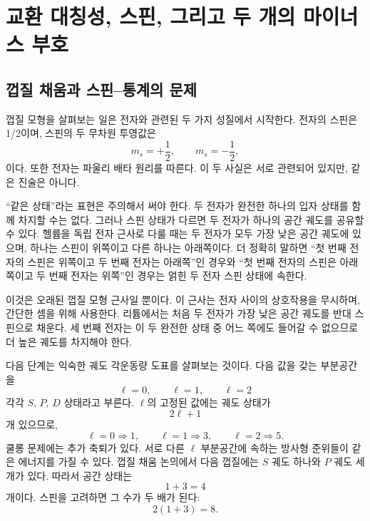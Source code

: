 \chapter{교환 대칭성, 스핀, 그리고 두 개의 마이너스 부호}

\section{껍질 채움과 스핀--통계의 문제}

껍질 모형을 살펴보는 일은 전자와 관련된 두 가지 성질에서 시작한다. 전자의 스핀은 1/2이며, 스핀의 두 무차원 투영값은
\begin{equation}
m_s=+\frac12,
\qquad
m_s=-\frac12,
\end{equation}
이다. 또한 전자는 파울리 배타 원리를 따른다. 이 두 사실은 서로 관련되어 있지만, 같은 진술은 아니다.

``같은 상태''라는 표현은 주의해서 써야 한다. 두 전자가 완전한 하나의 입자 상태를 함께 차지할 수는 없다. 그러나 스핀 상태가 다르면 두 전자가 하나의 공간 궤도를 공유할 수 있다. 헬륨을 독립 전자 근사로 다룰 때는 두 전자가 모두 가장 낮은 공간 궤도에 있으며, 하나는 스핀이 위쪽이고 다른 하나는 아래쪽이다. 더 정확히 말하면 ``첫 번째 전자의 스핀은 위쪽이고 두 번째 전자는 아래쪽''인 경우와 ``첫 번째 전자의 스핀은 아래쪽이고 두 번째 전자는 위쪽''인 경우는 얽힌 두 전자 스핀 상태에 속한다.

이것은 오래된 껍질 모형 근사일 뿐이다. 이 근사는 전자 사이의 상호작용을 무시하며, 간단한 셈을 위해 사용한다. 리튬에서는 처음 두 전자가 가장 낮은 공간 궤도를 반대 스핀으로 채운다. 세 번째 전자는 이 두 완전한 상태 중 어느 쪽에도 들어갈 수 없으므로 더 높은 궤도를 차지해야 한다.

다음 단계는 익숙한 궤도 각운동량 도표를 살펴보는 것이다. 다음 값을 갖는 부분공간을
\begin{equation}
\ell=0,\qquad \ell=1,\qquad \ell=2
\end{equation}
각각 \(S\), \(P\), \(D\) 상태라고 부른다. \(\ell\)의 고정된 값에는 궤도 상태가
\begin{equation}
2\ell+1
\end{equation}
개 있으므로,
\begin{equation}
\ell=0\Rightarrow 1,
\qquad
\ell=1\Rightarrow 3,
\qquad
\ell=2\Rightarrow 5.
\end{equation}
쿨롱 문제에는 추가 축퇴가 있다. 서로 다른 \(\ell\) 부분공간에 속하는 방사형 준위들이 같은 에너지를 가질 수 있다. 껍질 채움 논의에서 다음 껍질에는 \(S\) 궤도 하나와 \(P\) 궤도 세 개가 있다. 따라서 공간 상태는
\begin{equation}
1+3=4
\end{equation}
개이다. 스핀을 고려하면 그 수가 두 배가 된다:
\begin{equation}
2(1+3)=8.
\end{equation}

